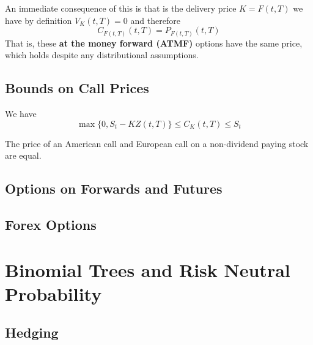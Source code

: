 \documentclass{article}
\begin{document}
    An immediate consequence of this is that is the delivery price $K = F(t, T)$ we have by definition $V_K (t, T) = 0$ and therefore 
    \begin{equation}
      C_{F(t, T)} (t, T) = P_{F(t, T)} (t, T)
    \end{equation}
    That is, these \textbf{at the money forward (ATMF)} options have the same price, which holds despite any distributional assumptions. 

  \subsection{Bounds on Call Prices}

    \begin{theorem}
      We have 
      \begin{equation}
        \max\{0, S_t - K Z(t, T)\} \leq C_K (t, T) \leq S_t
      \end{equation}
    \end{theorem}

    \begin{corollary}
      The price of an American call and European call on a non-dividend paying stock are equal. 
    \end{corollary}

  \subsection{Options on Forwards and Futures}

  \subsection{Forex Options}

\section{Binomial Trees and Risk Neutral Probability}

  \subsection{Hedging}
\end{document}
